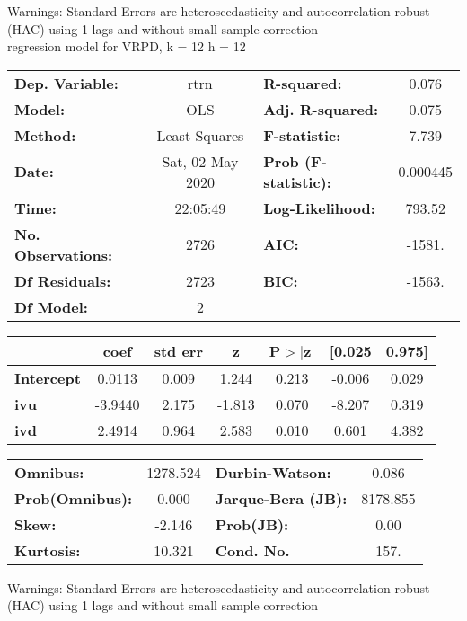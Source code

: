 Warnings: \newline
 [1] Standard Errors are heteroscedasticity and autocorrelation robust (HAC) using 1 lags and without small sample correction\\ 

regression model for VRPD, k = 12 h = 12\begin{center}
\begin{tabular}{lclc}
\toprule
\textbf{Dep. Variable:}    &       rtrn       & \textbf{  R-squared:         } &     0.076   \\
\textbf{Model:}            &       OLS        & \textbf{  Adj. R-squared:    } &     0.075   \\
\textbf{Method:}           &  Least Squares   & \textbf{  F-statistic:       } &     7.739   \\
\textbf{Date:}             & Sat, 02 May 2020 & \textbf{  Prob (F-statistic):} &  0.000445   \\
\textbf{Time:}             &     22:05:49     & \textbf{  Log-Likelihood:    } &    793.52   \\
\textbf{No. Observations:} &        2726      & \textbf{  AIC:               } &    -1581.   \\
\textbf{Df Residuals:}     &        2723      & \textbf{  BIC:               } &    -1563.   \\
\textbf{Df Model:}         &           2      & \textbf{                     } &             \\
\bottomrule
\end{tabular}
\begin{tabular}{lcccccc}
                   & \textbf{coef} & \textbf{std err} & \textbf{z} & \textbf{P$> |$z$|$} & \textbf{[0.025} & \textbf{0.975]}  \\
\midrule
\textbf{Intercept} &       0.0113  &        0.009     &     1.244  &         0.213        &       -0.006    &        0.029     \\
\textbf{ivu}       &      -3.9440  &        2.175     &    -1.813  &         0.070        &       -8.207    &        0.319     \\
\textbf{ivd}       &       2.4914  &        0.964     &     2.583  &         0.010        &        0.601    &        4.382     \\
\bottomrule
\end{tabular}
\begin{tabular}{lclc}
\textbf{Omnibus:}       & 1278.524 & \textbf{  Durbin-Watson:     } &    0.086  \\
\textbf{Prob(Omnibus):} &   0.000  & \textbf{  Jarque-Bera (JB):  } & 8178.855  \\
\textbf{Skew:}          &  -2.146  & \textbf{  Prob(JB):          } &     0.00  \\
\textbf{Kurtosis:}      &  10.321  & \textbf{  Cond. No.          } &     157.  \\
\bottomrule
\end{tabular}
\end{center}

Warnings: \newline
 [1] Standard Errors are heteroscedasticity and autocorrelation robust (HAC) using 1 lags and without small sample correction\\ 

